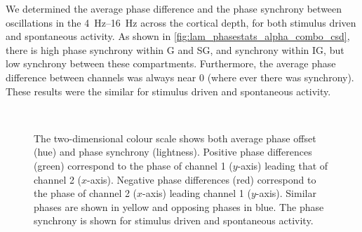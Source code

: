 

We determined the average phase difference and the phase synchrony between oscillations in the \SIrange{4}{16}{Hz} across the cortical depth, for both stimulus driven and spontaneous activity.
As shown in \autoref{fig:lam_phasestats_alpha_combo_csd}, there is high phase synchrony within \ac{G} and \ac{SG}, and synchrony within \ac{IG}, but low synchrony between these compartments.
Furthermore, the average phase difference between channels was always near $0$ (where ever there was synchrony).
These results were the similar for stimulus driven and spontaneous activity.

\begin{figure}[htbp]
    \centering
    \\
    \caption{
The two-dimensional colour scale shows both average phase offset (hue) and phase synchrony (lightness).
Positive phase differences (green) correspond to the phase of channel 1 ($y$-axis) leading that of channel 2 ($x$-axis).
Negative phase differences (red) correspond to the phase of channel 2 ($x$-axis) leading channel 1 ($y$-axis).
Similar phases are shown in yellow and opposing phases in blue.
The phase synchrony is shown for stimulus driven \protect{} and spontaneous \protect{} activity.
}
\label{fig:lam_phasestats_alpha_combo_csd}
\end{figure}



